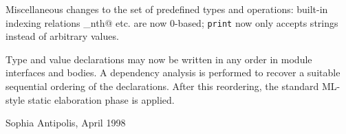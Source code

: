 Miscellaneous changes to the set of predefined types and operations:
built-in indexing relations \verb@list_nth@ etc. are now 0-based;
\texttt{print} now only accepts strings instead of arbitrary values.

Type and value declarations may now be written in any order in module
interfaces and bodies. A dependency analysis is performed to recover
a suitable sequential ordering of the declarations. After this reordering,
the standard ML-style static elaboration phase is applied.

\begin{flushright}
Sophia Antipolis, April 1998
\end{flushright}
